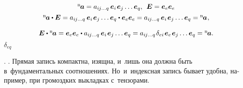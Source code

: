 \begin{otherlanguage}{russian}
\nopagebreak\vspace{-0.1em}\[\begin{array}{c}
{^\mathrm{n}\hspace{-0.2ex}\bm{a}} = a_{i\hspace{-0.1ex}j \ldots q} \hspace{.4ex} \bm{e}_i \hspace{.2ex} \bm{e}_j \ldots \bm{e}_q , \;\,  \bm{E} = \bm{e}_e \bm{e}_e
\\[.4em]
%
{^\mathrm{n}\hspace{-0.2ex}\bm{a}} \dotp \bm{E} = a_{i\hspace{-0.1ex}j \ldots q} \hspace{.4ex} \bm{e}_i \hspace{.2ex} \bm{e}_j \ldots \tikzmark{BeginDeltaEQBrace} {\bm{e}_q \dotp \bm{e}_e} \tikzmark{EndDeltaEQBrace} \bm{e}_e = a_{i\hspace{-0.1ex}j \ldots q} \hspace{.4ex} \bm{e}_i \hspace{.2ex} \bm{e}_j \ldots \bm{e}_q = {^\mathrm{n}\hspace{-0.2ex}\bm{a}} \hspace{.1ex},
\\[1.1em]
%
\bm{E} \dotp {^\mathrm{n}\hspace{-0.2ex}\bm{a}} = \bm{e}_e \bm{e}_e \dotp a_{i\hspace{-0.1ex}j \ldots q} \hspace{.4ex} \bm{e}_i \hspace{.2ex} \bm{e}_j \ldots \bm{e}_q = a_{i\hspace{-0.1ex}j \ldots q} \hspace{.2ex} \delta_{ei} \hspace{.2ex} \bm{e}_e \hspace{.2ex} \bm{e}_j \ldots \bm{e}_q = {^\mathrm{n}\hspace{-0.2ex}\bm{a}}.
\end{array}\]
%
{${\scriptstyle \delta_{eq}}$}

\vspace{-0.5em}    .   . Прямая запись компактна, изящна, и~лишь она должна быть в~фундаментальных соотношениях. Но~и~индексная запись бывает удобна, например, при громоздких выкладках с~тензорами.

\end{otherlanguage}

